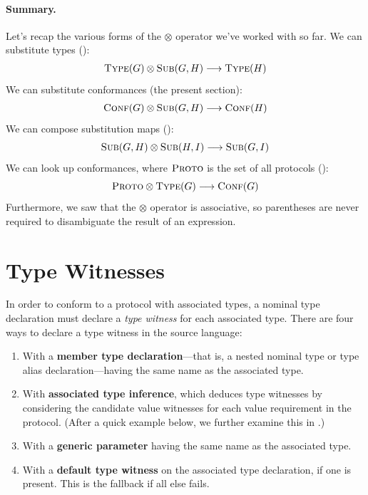 \documentclass[../generics]{subfiles}
\begin{document}
\paragraph{Summary.}
Let's recap the various forms of the \index{$\otimes$}$\otimes$ operator we've worked with so far. We can substitute types ():
\begin{gather*}
\textsc{Type}({G})\otimes\textsc{Sub}({G, H})\longrightarrow\textsc{Type}({H})
\end{gather*}
We can substitute conformances (the present section):
\begin{gather*}
\textsc{Conf}({G})\otimes\textsc{Sub}({G, H})\longrightarrow\textsc{Conf}({H})
\end{gather*}
We can compose substitution maps ():
\[\textsc{Sub}({G, H})\otimes\textsc{Sub}({H, I})\longrightarrow\textsc{Sub}({G, I})\]
We can look up conformances, where $\textsc{Proto}$ is the set of all protocols ():
\[\textsc{Proto} \otimes \textsc{Type}({G}) \longrightarrow \textsc{Conf}({G})\]
Furthermore, we saw that the $\otimes$ operator is associative, so parentheses are never required to disambiguate the result of an expression.

\section{Type Witnesses}\label{type witnesses}

In order to conform to a protocol with associated types, a nominal type declaration must declare a \emph{type witness} for each associated type. There are four ways to declare a type witness in the source language:
\begin{enumerate}
\item With a \textbf{member type declaration}---that is, a nested nominal type or type alias declaration---having the same name as the associated type.
\item With \textbf{associated type inference}, which deduces type witnesses by considering the candidate value witnesses for each value requirement in the protocol. (After a quick example below, we further examine this in .)
\item With a \textbf{generic parameter} having the same name as the associated type.
\item With a \textbf{default type witness} on the associated type declaration, if one is present. This is the fallback if all else fails.
\end{enumerate}
\end{document}

